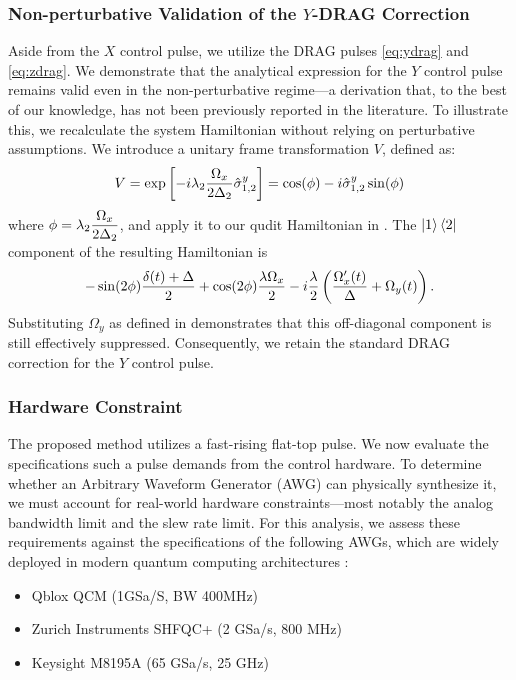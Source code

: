 \subsubsection{Non-perturbative Validation of the $Y$-DRAG Correction}
Aside from the $X$ control pulse, we utilize the DRAG pulses \ref{eq:ydrag} and \ref{eq:zdrag}.
We demonstrate that the analytical expression for the $Y$ control pulse remains valid even in the non-perturbative
regime---a derivation that, to the best of our knowledge, has not been previously reported in the literature. To
illustrate this, we recalculate the system Hamiltonian without relying on perturbative assumptions. We introduce a
unitary frame transformation $V$, defined as:
\begin{equation}
  V = \exp\left[-i\lambda_2\dfrac{\Omega_{x}}{2\Delta_2}\hat{\sigma}^y_{1,2}\right]
  = \cos(\phi) -i\hat{\sigma}^y_{1,2}\sin(\phi)
  \label{eq:first_frame_change}
\end{equation}
where $\phi = \lambda_2\dfrac{\Omega_{x}}{2\Delta_2}$, and apply it to our qudit Hamiltonian in .
The $\ket{1}\bra{2}$ component of the resulting Hamiltonian is
$$
  -\sin(2\phi)\dfrac{\delta(t)+\Delta}{2}+\cos(2\phi)\dfrac{\lambda \Omega_{x}}{2}-i\dfrac{\lambda}{2}\left(\dfrac{\Omega_x^\prime(t)}{\Delta}+\Omega_y(t)\right).
$$
Substituting $\Omega_y$ as defined in  demonstrates that this off-diagonal component is still effectively
suppressed. Consequently, we retain the standard DRAG correction  for the $Y$ control pulse.

\subsubsection{Hardware Constraint}
The proposed method utilizes a fast-rising flat-top pulse. We now evaluate the specifications such a pulse
demands from the control hardware. To determine whether an Arbitrary Waveform Generator (AWG) can physically synthesize
it, we must account for real-world hardware constraints---most notably the analog bandwidth limit and the slew rate limit.
For this analysis, we assess these requirements against the specifications of the following AWGs, which are widely
deployed in modern quantum computing architectures \cite{Keysight}:

\begin{itemize}
  \item Qblox QCM (1GSa/S, BW 400MHz)
  \item Zurich Instruments SHFQC+ (2 GSa/s, 800 MHz)
  \item Keysight M8195A (65 GSa/s, 25 GHz)
\end{itemize}

